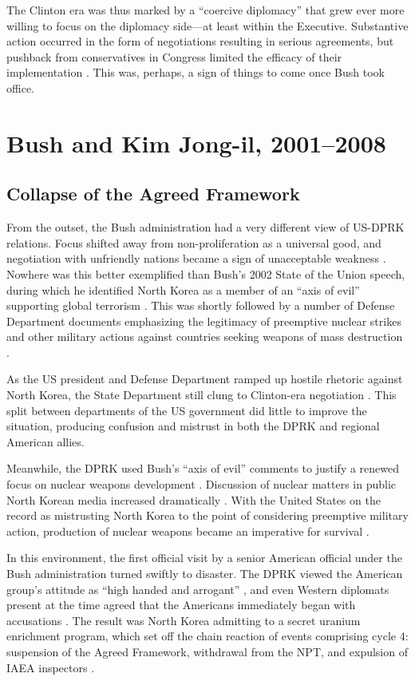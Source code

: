 The Clinton era was thus marked by a ``coercive diplomacy'' that grew ever more willing to focus on the diplomacy side---at least within the Executive. Substantive action occurred in the form of negotiations resulting in serious agreements, but pushback from conservatives in Congress limited the efficacy of their implementation \cite{harnisch}. This was, perhaps, a sign of things to come once Bush took office.
	
\section{Bush and Kim Jong-il, 2001--2008}

\subsection{Collapse of the Agreed Framework}

From the outset, the Bush administration had a very different view of US-DPRK relations. Focus shifted away from non-proliferation as a universal good, and negotiation with unfriendly nations became a sign of unacceptable weakness \cite{bleiker}. Nowhere was this better exemplified than Bush's 2002 State of the Union speech, during which he identified North Korea as a member of an ``axis of evil'' supporting global terrorism \cite{sotu02}. This was shortly followed by a number of Defense Department documents emphasizing the legitimacy of preemptive nuclear strikes and other military actions against countries seeking weapons of mass destruction \cite{bleiker,npreview}.

As the US president and Defense Department ramped up hostile rhetoric against North Korea, the State Department still clung to Clinton-era negotiation \cite{harnisch,armitage}. This split between departments of the US government did little to improve the situation, producing confusion and mistrust in both the DPRK and regional American allies.

Meanwhile, the DPRK used Bush's ``axis of evil'' comments to justify a renewed focus on nuclear weapons development \cite{bleiker}. Discussion of nuclear matters in public North Korean media increased dramatically \cite{rich14}. With the United States on the record as mistrusting North Korea to the point of considering preemptive military action, production of nuclear weapons became an imperative for survival \cite{hecker2}.

In this environment, the first official visit by a senior American official under the Bush administration turned swiftly to disaster. The DPRK viewed the American group's attitude as ``high handed and arrogant'' \cite{kcna3}, and even Western diplomats present at the time agreed that the Americans immediately began with accusations \cite{bleiker}. The result was North Korea admitting to a secret uranium enrichment program, which set off the chain reaction of events comprising cycle 4: suspension of the Agreed Framework, withdrawal from the NPT, and expulsion of IAEA inspectors \cite{iaea09}. 

